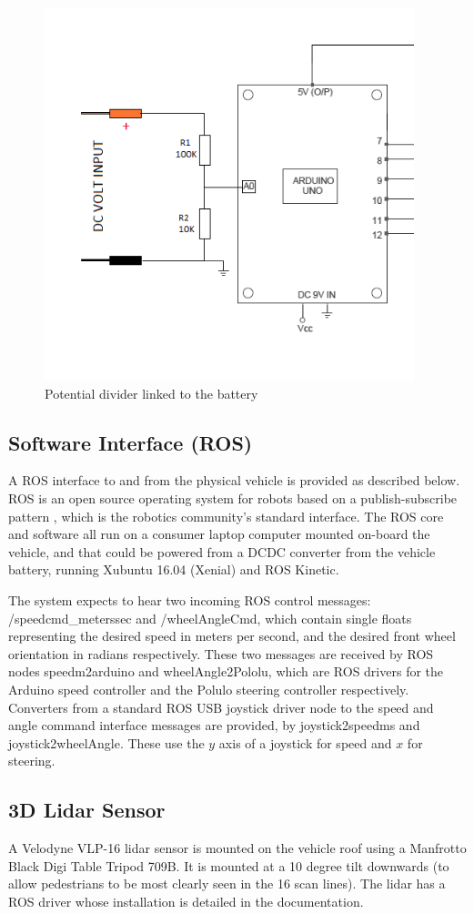 \documentclass[a4paper]{article}
\begin{document}
	\begin{figure}
		\includegraphics[width=0.5\columnwidth]{hardware/potential_divider.png}
		\caption{Potential divider linked to the battery}
		\label{fig:potential_divider}
	\end{figure}
	
	\subsection{Software Interface (ROS)}
	
	A ROS interface to and from the physical vehicle is provided as described below. ROS is an open source operating system for robots based on a publish-subscribe pattern \cite{quigley2009ros}, which is the robotics community’s standard interface. The ROS core and software all run on a consumer laptop computer mounted on-board the vehicle, and that could be powered from a DCDC converter from the vehicle battery, running Xubuntu 16.04 (Xenial) and ROS Kinetic. 
	
	The system expects to hear two incoming ROS control messages: /speedcmd\_meterssec and /wheelAngleCmd, which contain single floats representing the desired speed in meters per second, and the desired front wheel orientation in radians respectively. These two messages are received by ROS nodes speedm2arduino and wheelAngle2Pololu, which are ROS drivers for the Arduino speed controller and the Polulo steering controller respectively. Converters from a standard ROS USB joystick driver node to the speed and angle command interface messages are provided, by joystick2speedms and joystick2wheelAngle. These use the $y$ axis of a joystick for speed and $x$ for steering.
	
	\subsection{3D Lidar Sensor}
	A Velodyne VLP-16 lidar sensor is mounted on the vehicle roof using a Manfrotto Black Digi Table Tripod 709B. It is mounted at a 10 degree tilt downwards (to allow pedestrians to be most clearly seen in the 16 scan lines). The lidar has a ROS driver whose installation is detailed in the documentation. 
	
\end{document}
